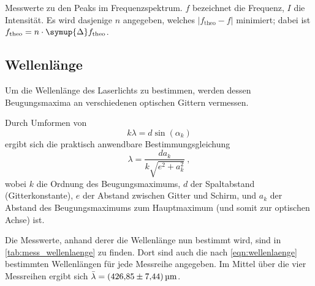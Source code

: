 \begin{table}
  \centering
  \caption{
    Messwerte zu den Peaks im Frequenzspektrum.
    $f$ bezeichnet die Frequenz, $I$ die Intensität.
    Es wird dasjenige $n$ angegeben, welches $|f_\text{theo} - f|$ minimiert;
    dabei ist $f_\text{theo} = n \cdot \symup{\Delta}f_\text{theo}$.
  }
  \def\belmilliwatt{Bm}
  \label{tab:frequenzspektrum}
\end{table}



\subsection{Wellenlänge}
\label{sec:auswertung:wellenlaenge}
Um die Wellenlänge des Laserlichts zu bestimmen,
werden dessen Beugungsmaxima an verschiedenen optischen Gittern vermessen.

Durch Umformen von
\begin{equation*}
  k \lambda = d \sin(\alpha_k)
\end{equation*}
ergibt sich die praktisch anwendbare Bestimmungsgleichung
\begin{equation}
  \lambda = \frac{d a_k}{k \sqrt{e^2 + a_k^2}} \ ,
  \label{eqn:wellenlaenge}
\end{equation}
wobei $k$ die Ordnung des Beugungsmaximums,
$d$ der Spaltabstand (Gitterkonstante),
$e$ der Abstand zwischen Gitter und Schirm, %
und $a_k$ der Abstand des Beugungsmaximums zum Hauptmaximum (und somit zur optischen Achse)
ist.

Die Messwerte, anhand derer die Wellenlänge nun bestimmt wird, sind in \autoref{tab:mess_wellenlaenge} zu finden.
Dort sind auch die nach \autoref{eqn:wellenlaenge} bestimmten Wellenlängen für jede Messreihe angegeben.
Im Mittel über die vier Messreihen ergibt sich $\bar\lambda = \SI{426.85 \pm 7.44}{\micro\meter}$.


